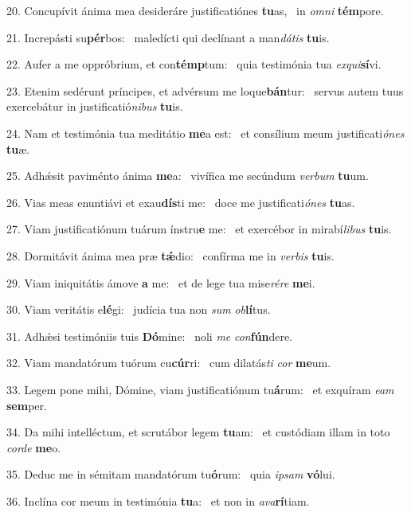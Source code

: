 20. Concupívit ánima mea desideráre justificatiónes \textbf{tu}as, \ast\  in \textit{om}\textit{ni} \textbf{tém}pore.\

21. Increpásti su\textbf{pér}bos: \ast\  maledícti qui declínant a man\textit{dá}\textit{tis} \textbf{tu}is.\

22. Aufer a me oppróbrium, et con\textbf{témp}tum: \ast\  quia testimónia tua \textit{ex}\textit{qui}\textbf{sí}vi.\

23. Etenim sedérunt príncipes, et advérsum me loque\textbf{bán}tur: \ast\  servus autem tuus exercebátur in justificatió\textit{ni}\textit{bus} \textbf{tu}is.\

24. Nam et testimónia tua meditátio \textbf{me}a est: \ast\  et consílium meum justificati\textit{ó}\textit{nes} \textbf{tu}æ.\

25. Adhǽsit paviménto ánima \textbf{me}a: \ast\  vivífica me secúndum \textit{ver}\textit{bum} \textbf{tu}um.\

26. Vias meas enuntiávi et exau\textbf{dís}ti me: \ast\  doce me justificati\textit{ó}\textit{nes} \textbf{tu}as.\

27. Viam justificatiónum tuárum ínstru\textbf{e} me: \ast\  et exercébor in mirabí\textit{li}\textit{bus} \textbf{tu}is.\

28. Dormitávit ánima mea præ \textbf{tǽ}dio: \ast\  confírma me in \textit{ver}\textit{bis} \textbf{tu}is.\

29. Viam iniquitátis ámove \textbf{a} me: \ast\  et de lege tua mise\textit{ré}\textit{re} \textbf{me}i.\

30. Viam veritátis e\textbf{lé}gi: \ast\  judícia tua non \textit{sum} \textit{ob}\textbf{lí}tus.\

31. Adhǽsi testimóniis tuis \textbf{Dó}mine: \ast\  noli \textit{me} \textit{con}\textbf{fún}dere.\

32. Viam mandatórum tuórum cu\textbf{cúr}ri: \ast\  cum dilatás\textit{ti} \textit{cor} \textbf{me}um.\

33. Legem pone mihi, Dómine, viam justificatiónum tu\textbf{á}rum: \ast\  et exquíram \textit{e}\textit{am} \textbf{sem}per.\

34. Da mihi intelléctum, et scrutábor legem \textbf{tu}am: \ast\  et custódiam illam in toto \textit{cor}\textit{de} \textbf{me}o.\

35. Deduc me in sémitam mandatórum tu\textbf{ó}rum: \ast\  quia \textit{ip}\textit{sam} \textbf{vó}lui.\

36. Inclína cor meum in testimónia \textbf{tu}a: \ast\  et non in \textit{a}\textit{va}\textbf{rí}tiam.\

